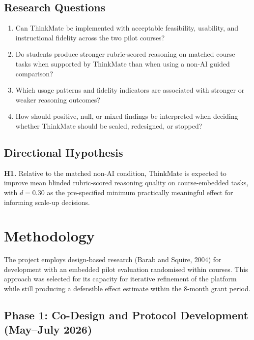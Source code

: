 \documentclass[11pt,a4paper]{article}
\begin{document}
\subsection*{Research Questions}
\begin{enumerate}[nosep, label={RQ\arabic*.}]
    \item Can ThinkMate be implemented with acceptable feasibility, usability, and instructional fidelity across the two pilot courses?
    \item Do students produce stronger rubric-scored reasoning on matched course tasks when supported by ThinkMate than when using a non-AI guided comparison?
    \item Which usage patterns and fidelity indicators are associated with stronger or weaker reasoning outcomes?
    \item How should positive, null, or mixed findings be interpreted when deciding whether ThinkMate should be scaled, redesigned, or stopped?
\end{enumerate}

\subsection*{Directional Hypothesis}
\textbf{H1.} Relative to the matched non-AI condition, ThinkMate is expected to improve mean blinded rubric-scored reasoning quality on course-embedded tasks, with $d = 0.30$ as the pre-specified minimum practically meaningful effect for informing scale-up decisions.

\section{Methodology}

The project employs design-based research (Barab and Squire, 2004) for development with an embedded pilot evaluation randomised within courses. This approach was selected for its capacity for iterative refinement of the platform while still producing a defensible effect estimate within the 8-month grant period.

\subsection*{Phase 1: Co-Design and Protocol Development (May--July 2026)}
\end{document}
